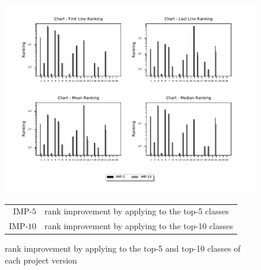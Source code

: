 \documentclass{article}
\begin{document}
\begin{appendices}
	\begin{figure}
		\centering
		\includegraphics[width=\textwidth]{figures/Chart_abs_imp.pdf}
		\caption{\sfl{} rank improvement by applying \ds{} to the top-5 and top-10 classes of each project version}
		\begin{tabular}{r@{: }l}
			IMP-$5$& \sfl{} rank improvement by applying \ds{} to the top-5 classes \\
			IMP-$10$& \sfl{} rank improvement by applying \ds{} to the top-10 classes
		\end{tabular}
		\label{fig:performance}
	\end{figure}
	
	
	
	
	

\end{appendices}
\end{document}
